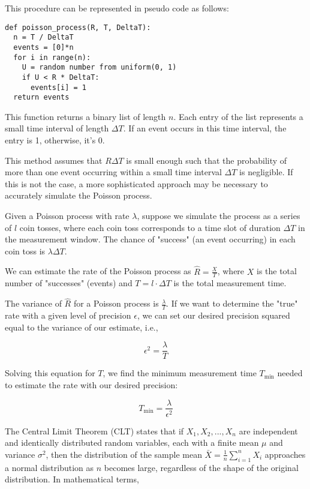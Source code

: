 This procedure can be represented in pseudo code as follows:

\begin{verbatim}
def poisson_process(R, T, DeltaT):
  n = T / DeltaT
  events = [0]*n
  for i in range(n):
    U = random number from uniform(0, 1)
    if U < R * DeltaT:
      events[i] = 1
  return events
\end{verbatim}

This function returns a binary list of length $n$. Each entry of the list represents a small time interval of length $\Delta T$. If an event occurs in this time interval, the entry is 1, otherwise, it's 0.

This method assumes that $R \Delta T$ is small enough such that the probability of more than one event occurring within a small time interval $\Delta T$ is negligible. If this is not the case, a more sophisticated approach may be necessary to accurately simulate the Poisson process.




Given a Poisson process with rate $\lambda$, suppose we simulate the process as a series of $l$ coin tosses, where each coin toss corresponds to a time slot of duration $\Delta T$ in the measurement window. The chance of "success" (an event occurring) in each coin toss is $\lambda \Delta T$.

We can estimate the rate of the Poisson process as $\hat{R} = \frac{X}{T}$, where $X$ is the total number of "successes" (events) and $T = l \cdot \Delta T$ is the total measurement time.

The variance of $\hat{R}$ for a Poisson process is $\frac{\lambda}{T}$. If we want to determine the "true" rate with a given level of precision $\epsilon$, we can set our desired precision squared equal to the variance of our estimate, i.e.,

\[
\epsilon^2 = \frac{\lambda}{T}
\]

Solving this equation for $T$, we find the minimum measurement time $T_{\text{min}}$ needed to estimate the rate with our desired precision:

\[
T_{\text{min}} = \frac{\lambda}{\epsilon^2}
\]




The Central Limit Theorem (CLT) states that if $X_1, X_2, ..., X_n$ are independent and identically distributed random variables, each with a finite mean $\mu$ and variance $\sigma^2$, then the distribution of the sample mean $\bar{X} = \frac{1}{n} \sum_{i=1}^{n} X_i$ approaches a normal distribution as $n$ becomes large, regardless of the shape of the original distribution. In mathematical terms,

